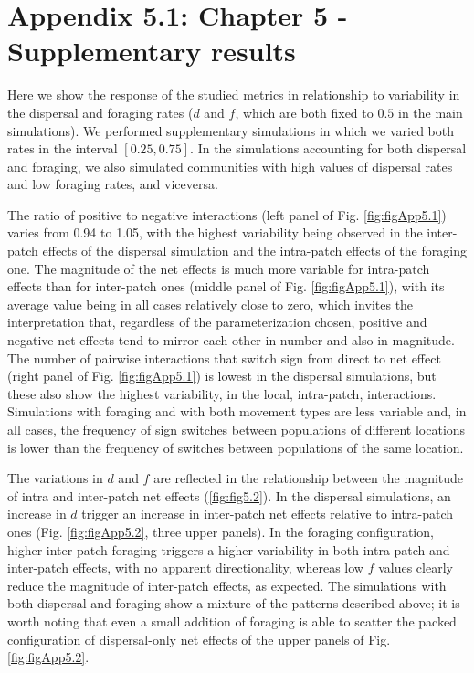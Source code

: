 \chapter[Appendix 5.1: Chapter 5 - Supplementary results]{Appendix 5.1: Chapter 5 - Supplementary results}\label{ch:spatial_appendix}

\renewcommand{\thefigure}{A.5.1.\arabic{figure}}
\setcounter{figure}{0}

\renewcommand{\thetable}{A.5.1.\arabic{table}}
\setcounter{table}{0}

Here we show the response of the studied metrics in relationship to variability in the dispersal and foraging rates (\(d\) and \(f\), which are both fixed to \(0.5\) in the main simulations). We performed supplementary simulations in which we varied both rates in the interval \([0.25,0.75]\). In the simulations accounting for both dispersal and foraging, we also simulated communities with high values of dispersal rates and low foraging rates, and viceversa.

The ratio of positive to negative interactions (left panel of Fig. \ref{fig:figApp5.1}) varies from 0.94 to 1.05, with the highest variability being observed in the inter-patch effects of the dispersal simulation and the intra-patch effects of the foraging one. The magnitude of the net effects is much more variable for intra-patch effects than for inter-patch ones (middle panel of Fig. \ref{fig:figApp5.1}), with its average value being in all cases relatively close to zero, which invites the interpretation that, regardless of the parameterization chosen, positive and negative net effects tend to mirror each other in number and also in magnitude. The number of pairwise interactions that switch sign from direct to net effect (right panel of Fig. \ref{fig:figApp5.1}) is lowest in the dispersal simulations, but these also show the highest variability, in the local, intra-patch, interactions. Simulations with foraging and with both movement types are less variable and, in all cases, the frequency of sign switches between populations of different locations is lower than the frequency of switches between populations of the same location.

The variations in \(d\) and \(f\) are reflected in the relationship between the magnitude of intra and inter-patch net effects (\cref{fig:fig5.2}). In the dispersal simulations, an increase in \(d\) trigger an increase in inter-patch net effects relative to intra-patch ones (Fig. \ref{fig:figApp5.2}, three upper panels). In the foraging configuration, higher inter-patch foraging triggers a higher variability in both intra-patch and inter-patch effects, with no apparent directionality, whereas low \(f\) values clearly reduce the magnitude of inter-patch effects, as expected. The simulations with both dispersal and foraging show a mixture of the patterns described above; it is worth noting that even a small addition of foraging is able to scatter the packed configuration of dispersal-only net effects of the upper panels of Fig. \ref{fig:figApp5.2}.

